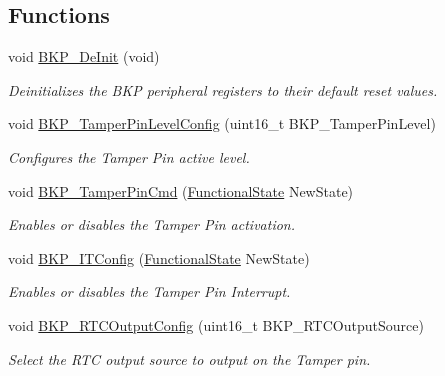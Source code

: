 \subsection*{Functions}
\begin{DoxyCompactItemize}
\item 
void \hyperlink{group___b_k_p___private___functions_gaabff4d8f5ebf4fd9a840bcc9042ca226}{B\+K\+P\+\_\+\+De\+Init} (void)
\begin{DoxyCompactList}\small\item\em Deinitializes the B\+KP peripheral registers to their default reset values. \end{DoxyCompactList}\item 
void \hyperlink{group___b_k_p___private___functions_gae216446d641d075fb575ce6dbe2ff4c1}{B\+K\+P\+\_\+\+Tamper\+Pin\+Level\+Config} (uint16\+\_\+t B\+K\+P\+\_\+\+Tamper\+Pin\+Level)
\begin{DoxyCompactList}\small\item\em Configures the Tamper Pin active level. \end{DoxyCompactList}\item 
void \hyperlink{group___b_k_p___private___functions_ga3a0cdff9ad8238ade2c67e2b70f530ac}{B\+K\+P\+\_\+\+Tamper\+Pin\+Cmd} (\hyperlink{group___exported__types_gac9a7e9a35d2513ec15c3b537aaa4fba1}{Functional\+State} New\+State)
\begin{DoxyCompactList}\small\item\em Enables or disables the Tamper Pin activation. \end{DoxyCompactList}\item 
void \hyperlink{group___b_k_p___private___functions_gab8dbd0c4773f6edb98a28c8ff6a2ead0}{B\+K\+P\+\_\+\+I\+T\+Config} (\hyperlink{group___exported__types_gac9a7e9a35d2513ec15c3b537aaa4fba1}{Functional\+State} New\+State)
\begin{DoxyCompactList}\small\item\em Enables or disables the Tamper Pin Interrupt. \end{DoxyCompactList}\item 
void \hyperlink{group___b_k_p___private___functions_ga3d1b22b3c6a79f7b423616a0af1885bf}{B\+K\+P\+\_\+\+R\+T\+C\+Output\+Config} (uint16\+\_\+t B\+K\+P\+\_\+\+R\+T\+C\+Output\+Source)
\begin{DoxyCompactList}\small\item\em Select the R\+TC output source to output on the Tamper pin. \end{DoxyCompactList}\item 

\end{DoxyCompactItemize}
